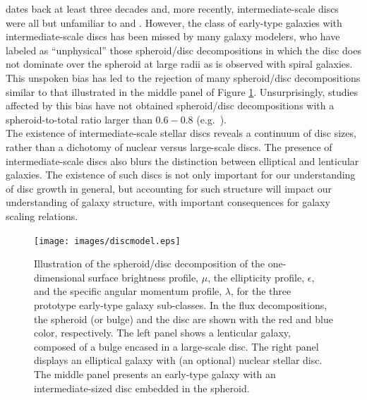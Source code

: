 \documentclass[useAMS,usenatbib,article]{mn2e}
\begin{document}
dates back at least three decades 
\citep{capaccioli1987,carter1987,rixwhite1990,bender1990,scorzabender1990,nieto1991,rixwhite1992,scorzabender1995,
donofrio1995,graham1998fornax,scorza1998,scorzavandenbosch1998} and, 
more recently, intermediate-scale discs were all but unfamiliar to \cite{kormendybender2012} and \cite{krajnovic2013etal}. 
However, the class of early-type galaxies with intermediate-scale discs has been missed by many galaxy modelers, 
who have labeled as ``unphysical'' \citep{allen2006} those spheroid/disc decompositions in which the disc does not dominate over the spheroid at large radii 
as is observed with spiral galaxies. 
This unspoken bias has led to the rejection of many spheroid/disc decompositions similar to that illustrated in the middle panel of Figure \ref{fig:model}. 
Unsurprisingly, studies affected by this bias have not obtained spheroid/disc decompositions with a spheroid-to-total ratio larger than $0.6 - 0.8$ 
(e.g.~\citealt{gadotti2008,head2014,querejeta2015,mendezabreu2015}). \\
The existence of intermediate-scale stellar discs reveals a continuum of disc sizes, 
rather than a dichotomy of nuclear versus large-scale discs. 
The presence of intermediate-scale discs also blurs the distinction between elliptical and lenticular galaxies.
The existence of such discs is not only important for our understanding of disc growth in general, 
but accounting for such structure will impact our understanding of galaxy structure, 
with important consequences for galaxy scaling relations. 

\begin{figure}
\begin{center}
\texttt{[image: images/discmodel.eps]}
\caption{Illustration of the spheroid/disc decomposition of the one-dimensional surface brightness profile, $\mu$, 
the ellipticity profile, $\epsilon$, and the specific angular momentum profile, $\lambda$,
for the three prototype early-type galaxy sub-classes. 
In the flux decompositions, the spheroid (or bulge) and the disc are shown with the red and blue color, respectively. 
The left panel shows a lenticular galaxy, composed of a bulge encased in a large-scale disc. 
The right panel displays an elliptical galaxy with (an optional) nuclear stellar disc. 
The middle panel presents an early-type galaxy with an intermediate-sized disc embedded in the spheroid. }
\label{fig:model}
\end{center}
\end{figure}
\end{document}
